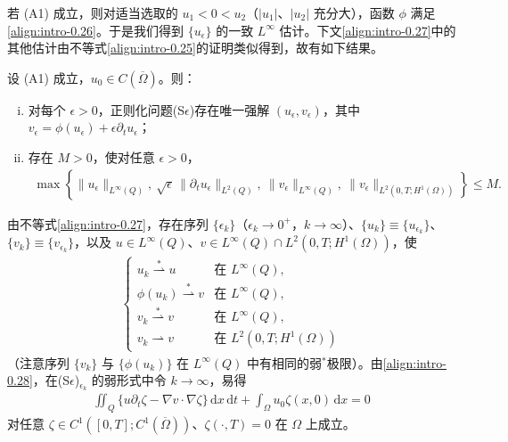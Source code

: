\documentclass[../main.tex]{subfiles}
\begin{document}
若 (A1) 成立，则对适当选取的 $u_1<0<u_2$（$|u_1|$、$|u_2|$ 充分大），函数 $\phi$ 满足\eqref{align:intro-0.26}。于是我们得到 $\{u_\epsilon\}$ 的一致 $L^\infty$ 估计。下文\eqref{align:intro-0.27}中的其他估计由不等式\eqref{align:intro-0.25}的证明类似得到，故有如下结果。

\begin{proposition}\label{proposition:intro-0.3.2}
设 (A1) 成立，$u_0\in C(\overline\Omega)$。则：
\begin{enumerate}[(i)]
\item\label{item:intro-0.3.2-i} 对每个 $\epsilon>0$，正则化问题(S$\epsilon$)存在唯一强解 $(u_\epsilon,v_\epsilon)$，其中 $v_\epsilon=\phi(u_\epsilon)+\epsilon\partial_t u_\epsilon$；
\item\label{item:intro-0.3.2-ii} 存在 $M>0$，使对任意 $\epsilon>0$，
\begin{align}
\max\left\{\|u_\epsilon\|_{L^\infty(Q)},\ \sqrt{\epsilon}\,\|\partial_t u_\epsilon\|_{L^2(Q)},\ \|v_\epsilon\|_{L^\infty(Q)},\ \|v_\epsilon\|_{L^2(0,T;H^1(\Omega))}\right\} \leqslant M. \label{align:intro-0.27}
\end{align}
\end{enumerate}
\end{proposition}

由不等式\eqref{align:intro-0.27}，存在序列 $\{\epsilon_k\}$（$\epsilon_k\to0^+$，$k\to\infty$）、$\{u_k\}\equiv\{u_{\epsilon_k}\}$、$\{v_k\}\equiv\{v_{\epsilon_k}\}$，以及 $u\in L^\infty(Q)$、$v\in L^\infty(Q)\cap L^2(0,T;H^1(\Omega))$，使
\begin{align}
\begin{cases}
u_k \stackrel{*}{\rightharpoonup} u & \text{在 }L^\infty(Q),\\
\phi(u_k) \stackrel{*}{\rightharpoonup} v & \text{在 }L^\infty(Q),\\
v_k \stackrel{*}{\rightharpoonup} v & \text{在 }L^\infty(Q),\\
v_k \rightharpoonup v & \text{在 }L^2(0,T;H^1(\Omega))
\end{cases}
\label{align:intro-0.28}
\end{align}
（注意序列 $\{v_k\}$ 与 $\{\phi(u_k)\}$ 在 $L^\infty(Q)$ 中有相同的弱$^*$极限）。由\eqref{align:intro-0.28}，在(S$\epsilon$)$_{\epsilon_k}$ 的弱形式中令 $k\to\infty$，易得
\begin{align}
\iint_Q\{u\partial_t\zeta - \nabla v\cdot\nabla\zeta\}\,\mathrm{d}x\,\mathrm{d}t
+ \int_\Omega u_0\zeta(x,0)\,\mathrm{d}x = 0 \label{align:intro-0.29}
\end{align}
对任意 $\zeta\in C^1([0,T];C^1(\overline\Omega))$、$\zeta(\cdot,T)=0$ 在 $\Omega$ 上成立。
\end{document}
